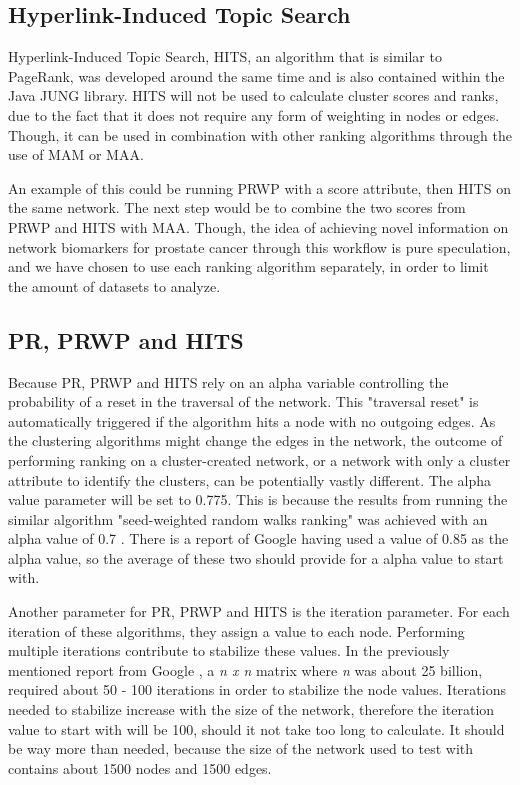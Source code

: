 \subsection{Hyperlink-Induced Topic Search}
Hyperlink-Induced Topic Search, HITS, an algorithm that is similar to PageRank,
was developed around the same time \cite{hits}\cite{hits-origin} and is also
contained within the Java JUNG library. HITS will not be used to calculate
cluster scores and ranks, due to the fact that it does not require any form of
weighting in nodes or edges. Though, it can be used in combination with other
ranking algorithms through the use of MAM or MAA. 

An example of this could be running PRWP with a score attribute, then HITS on
the same network. The next step would be to combine the two scores from PRWP and
HITS with MAA. Though, the idea of achieving novel information on network
biomarkers for prostate cancer through this workflow is pure speculation, and we
have chosen to use each ranking algorithm separately, in order to limit the
amount of datasets to analyze.

\subsection{PR, PRWP and HITS}
Because PR, PRWP and HITS rely on an alpha variable controlling the probability
of a reset in the traversal of the network. This "traversal reset" is
automatically triggered if the algorithm hits a node with no outgoing edges. As
the clustering algorithms might change the edges in the network, the outcome of
performing ranking on a cluster-created network, or a network with only
a cluster attribute to identify the clusters, can be potentially vastly
different. The alpha value parameter will be set to 0.775. This is because the
results from running the similar algorithm "seed-weighted random walks ranking"
was achieved with an alpha value of 0.7 \cite{sw-rwr}. There is a report of
Google having used a value of 0.85 \cite{pr-parameters} as the alpha value, so
the average of these two should provide for a alpha value to start with.

Another parameter for PR, PRWP and HITS is the iteration parameter. For each
iteration of these algorithms, they assign a value to each node. Performing
multiple iterations contribute to stabilize these values. In the previously
mentioned report from Google \cite{pr-parameters}, a \textit{n x n} matrix where
\textit{n} was about 25 billion, required about 50 - 100 iterations in order to
stabilize the node values. Iterations needed to stabilize increase with the size
of the network, therefore the iteration value to start with will be 100, should
it not take too long to calculate. It should be way more than needed, because
the size of the network used to test with contains about 1500 nodes and 1500
edges.


